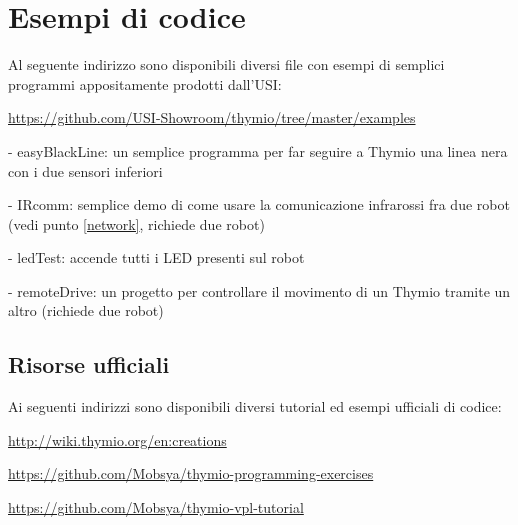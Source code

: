 \documentclass[12pt]{article}
\begin{document}
\section{Esempi di codice}\label{usiRepo}

Al seguente indirizzo sono disponibili diversi file con esempi di semplici programmi appositamente prodotti dall'USI:

\url{https://github.com/USI-Showroom/thymio/tree/master/examples}


- easyBlackLine: un semplice programma per far seguire a Thymio una linea nera con i due sensori inferiori

- IRcomm: semplice demo di come usare la comunicazione infrarossi fra due robot (vedi punto \ref{network}, richiede due robot)

- ledTest: accende tutti i LED presenti sul robot

- remoteDrive: un progetto per controllare il movimento di un Thymio tramite un altro (richiede due robot)

\newpage


\subsection{Risorse ufficiali}

Ai seguenti indirizzi sono disponibili diversi tutorial ed esempi ufficiali di codice:

\url{http://wiki.thymio.org/en:creations}

\url{https://github.com/Mobsya/thymio-programming-exercises}

\url{https://github.com/Mobsya/thymio-vpl-tutorial}
\end{document}
